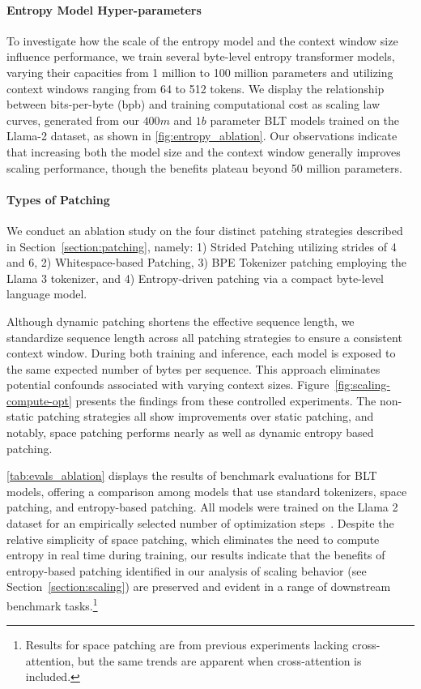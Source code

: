 \paragraph{Entropy Model Hyper-parameters} To investigate how the scale of the entropy model and the context window size influence performance, we train several byte-level entropy transformer models, varying their capacities from 1 million to 100 million parameters and utilizing context windows ranging from 64 to 512 tokens. We display the relationship between bits-per-byte (bpb) and training computational cost as scaling law curves, generated from our $400m$ and $1b$ parameter {\textsc BLT} models trained on the Llama-2 dataset, as shown in \autoref{fig:entropy_ablation}. Our observations indicate that increasing both the model size and the context window generally improves scaling performance, though the benefits plateau beyond 50 million parameters.

\paragraph{Types of Patching}

We conduct an ablation study on the four distinct patching strategies described in Section~\ref{section:patching}, namely: 1) Strided Patching utilizing strides of 4 and 6, 2) Whitespace-based Patching, 3) BPE Tokenizer patching employing the Llama 3 tokenizer, and 4) Entropy-driven patching via a compact byte-level language model.

Although dynamic patching shortens the effective sequence length, we standardize sequence length across all patching strategies to ensure a consistent context window. During both training and inference, each model is exposed to the same expected number of bytes per sequence. This approach eliminates potential confounds associated with varying context sizes. Figure~\ref{fig:scaling-compute-opt} presents the findings from these controlled experiments. The non-static patching strategies all show improvements over static patching, and notably, space patching performs nearly as well as dynamic entropy based patching.

\autoref{tab:evals_ablation} displays the results of benchmark evaluations for {\textsc BLT} models, offering a comparison among models that use standard tokenizers, space patching, and entropy-based patching. All models were trained on the Llama 2 dataset for an empirically selected number of optimization steps~\citep{dubey2024llama}. Despite the relative simplicity of space patching, which eliminates the need to compute entropy in real time during training, our results indicate that the benefits of entropy-based patching identified in our analysis of scaling behavior (see Section~\ref{section:scaling}) are preserved and evident in a range of downstream benchmark tasks.\footnote{Results for space patching are from previous experiments lacking cross-attention, but the same trends are apparent when cross-attention is included.}

